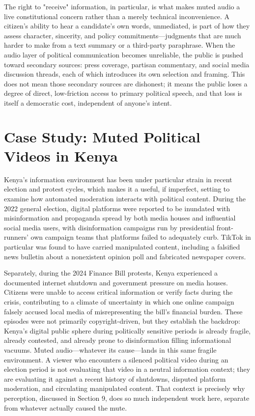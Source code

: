 \documentclass{article}
\begin{document}
The right to "receive" information, in particular, is what makes muted audio a live constitutional concern rather than a merely technical inconvenience. A citizen's ability to hear a candidate's own words, unmediated, is part of how they assess character, sincerity, and policy commitments—judgments that are much harder to make from a text summary or a third-party paraphrase. When the audio layer of political communication becomes unreliable, the public is pushed toward secondary sources: press coverage, partisan commentary, and social media discussion threads, each of which introduces its own selection and framing. This does not mean those secondary sources are dishonest; it means the public loses a degree of direct, low-friction access to primary political speech, and that loss is itself a democratic cost, independent of anyone's intent.

\section{Case Study: Muted Political Videos in Kenya}

Kenya's information environment has been under particular strain in recent election and protest cycles, which makes it a useful, if imperfect, setting to examine how automated moderation interacts with political content. During the 2022 general election, digital platforms were reported to be inundated with misinformation and propaganda spread by both media houses and influential social media users, with disinformation campaigns run by presidential front-runners' own campaign teams that platforms failed to adequately curb.\cite{freedomhouse2024} TikTok in particular was found to have carried manipulated content, including a falsified news bulletin about a nonexistent opinion poll and fabricated newspaper covers.\cite{freedomhouse2024}

Separately, during the 2024 Finance Bill protests, Kenya experienced a documented internet shutdown and government pressure on media houses. Citizens were unable to access critical information or verify facts during the crisis, contributing to a climate of uncertainty in which one online campaign falsely accused local media of misrepresenting the bill's financial burden.\cite{cipit2024} These episodes were not primarily copyright-driven, but they establish the backdrop: Kenya's digital public sphere during politically sensitive periods is already fragile, already contested, and already prone to disinformation filling informational vacuums. Muted audio—whatever its cause—lands in this same fragile environment. A viewer who encounters a silenced political video during an election period is not evaluating that video in a neutral information context; they are evaluating it against a recent history of shutdowns, disputed platform moderation, and circulating manipulated content. That context is precisely why perception, discussed in Section 9, does so much independent work here, separate from whatever actually caused the mute.
\end{document}
